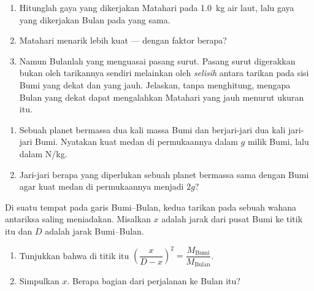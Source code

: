 \begin{exercise}[$\star\star$]\label{exo:g10:universal-gravitation:10}
\begin{enumerate}
  \item Hitunglah gaya yang dikerjakan Matahari pada \qty{1.0}{kg} air
        laut, lalu gaya yang dikerjakan Bulan pada  yang sama.
  \item Matahari menarik lebih kuat --- dengan faktor berapa?
  \item Namun Bulanlah yang menguasai pasang surut. Pasang surut
        digerakkan bukan oleh tarikannya sendiri melainkan oleh
        \emph{selisih} antara tarikan pada sisi Bumi yang dekat dan
        yang jauh. Jelaskan, tanpa menghitung, mengapa Bulan yang dekat
        dapat mengalahkan Matahari yang jauh menurut ukuran itu.
\end{enumerate}
\end{exercise}

\begin{exercise}[$\star\star$]\label{exo:g10:universal-gravitation:11}
\begin{enumerate}
  \item Sebuah planet bermassa dua kali massa Bumi dan berjari-jari dua
        kali jari-jari Bumi. Nyatakan kuat medan di permukaannya dalam
        $g$ milik Bumi, lalu dalam \unit{N/kg}.
  \item Jari-jari berapa yang diperlukan sebuah planet bermassa sama
        dengan Bumi agar kuat medan di permukaannya menjadi $2g$?
\end{enumerate}
\end{exercise}

\begin{exercise}[$\star\star\star$]\label{exo:g10:universal-gravitation:12}
Di suatu tempat pada garis Bumi--Bulan, kedua tarikan pada sebuah wahana
antariksa saling meniadakan. Misalkan $x$ adalah jarak dari pusat Bumi
ke titik itu dan $D$ adalah jarak Bumi--Bulan.
\begin{enumerate}
  \item Tunjukkan bahwa di titik itu
        $\left(\dfrac{x}{D - x}\right)^{2}
        = \dfrac{M_{\text{Bumi}}}{M_{\text{Bulan}}}$.
  \item Simpulkan $x$. Berapa bagian dari perjalanan ke Bulan itu?
\end{enumerate}
\end{exercise}

